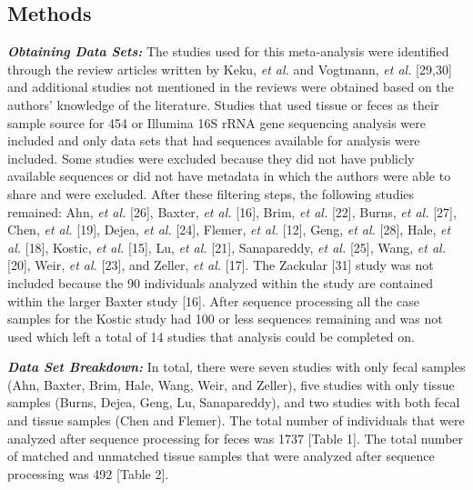 \documentclass[12pt,]{article}
\begin{document}
\newpage

\subsection{Methods}\label{methods}

\textbf{\emph{Obtaining Data Sets:}} The studies used for this
meta-analysis were identified through the review articles written by
Keku, \emph{et al.} and Vogtmann, \emph{et al.} {[}29,30{]} and
additional studies not mentioned in the reviews were obtained based on
the authors' knowledge of the literature. Studies that used tissue or
feces as their sample source for 454 or Illumina 16S rRNA gene
sequencing analysis were included and only data sets that had sequences
available for analysis were included. Some studies were excluded because
they did not have publicly available sequences or did not have metadata
in which the authors were able to share and were excluded. After these
filtering steps, the following studies remained: Ahn, \emph{et al.}
{[}26{]}, Baxter, \emph{et al.} {[}16{]}, Brim, \emph{et al.} {[}22{]},
Burns, \emph{et al.} {[}27{]}, Chen, \emph{et al.} {[}19{]}, Dejea,
\emph{et al.} {[}24{]}, Flemer, \emph{et al.} {[}12{]}, Geng, \emph{et
al.} {[}28{]}, Hale, \emph{et al.} {[}18{]}, Kostic, \emph{et al.}
{[}15{]}, Lu, \emph{et al.} {[}21{]}, Sanapareddy, \emph{et al.}
{[}25{]}, Wang, \emph{et al.} {[}20{]}, Weir, \emph{et al.} {[}23{]},
and Zeller, \emph{et al.} {[}17{]}. The Zackular {[}31{]} study was not
included because the 90 individuals analyzed within the study are
contained within the larger Baxter study {[}16{]}. After sequence
processing all the case samples for the Kostic study had 100 or less
sequences remaining and was not used which left a total of 14 studies
that analysis could be completed on.

\textbf{\emph{Data Set Breakdown:}} In total, there were seven studies
with only fecal samples (Ahn, Baxter, Brim, Hale, Wang, Weir, and
Zeller), five studies with only tissue samples (Burns, Dejea, Geng, Lu,
Sanapareddy), and two studies with both fecal and tissue samples (Chen
and Flemer). The total number of individuals that were analyzed after
sequence processing for feces was 1737 {[}Table 1{]}. The total number
of matched and unmatched tissue samples that were analyzed after
sequence processing was 492 {[}Table 2{]}.
\end{document}

